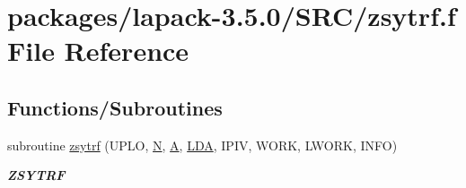 \hypertarget{zsytrf_8f}{}\section{packages/lapack-\/3.5.0/\+S\+R\+C/zsytrf.f File Reference}
\label{zsytrf_8f}
\subsection*{Functions/\+Subroutines}
\begin{DoxyCompactItemize}
\item 
subroutine \hyperlink{group__complex16SYcomputational_gabb59c91a81aaf15dc63594bbc96c0ed7}{zsytrf} (U\+P\+L\+O, \hyperlink{polmisc_8c_a0240ac851181b84ac374872dc5434ee4}{N}, \hyperlink{classA}{A}, \hyperlink{example__user_8c_ae946da542ce0db94dced19b2ecefd1aa}{L\+D\+A}, I\+P\+I\+V, W\+O\+R\+K, L\+W\+O\+R\+K, I\+N\+F\+O)
\begin{DoxyCompactList}\small\item\em {\bfseries Z\+S\+Y\+T\+R\+F} \end{DoxyCompactList}\end{DoxyCompactItemize}

